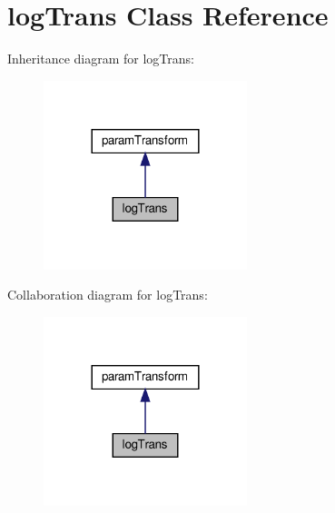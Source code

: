 \hypertarget{classlogTrans}{}\section{log\+Trans Class Reference}
\label{classlogTrans}


Inheritance diagram for log\+Trans\+:
\nopagebreak
\begin{figure}[H]
\begin{center}
\leavevmode
\includegraphics[width=168pt]{classlogTrans__inherit__graph}
\end{center}
\end{figure}


Collaboration diagram for log\+Trans\+:
\nopagebreak
\begin{figure}[H]
\begin{center}
\leavevmode
\includegraphics[width=168pt]{classlogTrans__coll__graph}
\end{center}
\end{figure}
